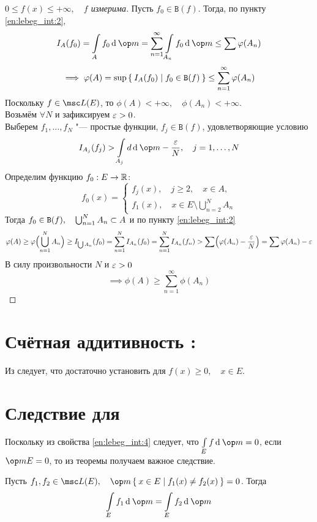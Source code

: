\begin{proof}[$ 0 \le f(x) \le +\infty, \quad f $ измерима]
	Пусть $ f_0 \in \mathtt B(f) $. Тогда, по пункту \ref{en:lebeg_int:2},
	$$ I_A(f_0) = \int\limits_A f_0 \di \op m = \sum_{n = 1}^\infty \int\limits_{A_n} f_0 \di \op m \le \sum \phi(A_n) $$
	$$ \implies \varphi(A) = \sup \Set{I_A(f_0) \mid f_0 \in \mathtt B(f)} \le \sum_{n = 1}^\infty \varphi(A_n) $$
	Поскольку $ f \in \msc L(E) $, то $ \phi(A) < +\infty, \quad \phi(A_n) < +\infty $. \\
	Возьмём $ \forall N $ и зафиксируем $ \varepsilon > 0 $. \\
	Выберем $ f_1, \dots, f_N $ "--- простые функции, $ f_j \in \mathtt B(f) $, удовлетворяющие условию
	$$ I_{A_j}(f_j) > \int\limits_{A_j} d \di \op m - \frac\eps N, \quad j = 1, \dots, N $$
	Определим функцию $ f_0 : E \to \mathbb{R} $:
	$$ f_0(x) =
	\begin{cases}
		f_j(x), \quad j \ge 2, \quad x \in A, \\
		f_1(x), \quad x \in E \setminus \bigcup_{n = 2}^N A_n
	\end{cases} $$
	Тогда $ f_0 \in \mathtt B(f), \quad \bigcup_{n = 1}^N A_n \subset A $ и по пункту \ref{en:lebeg_int:2}
	$$ \varphi(A) \ge \varphi \Bigl( \bigcup_{n = 1}^N A_n \Bigr) \ge I_{\bigcup A_n} (f_0) = \sum_{n = 1}^N I_{A_n} (f_0) = \sum_{n = 1}^N I_{A_n}(f_n) > \sum \Bigl( \varphi(A_n) - \frac{\varepsilon} N \Bigr) = \sum \varphi(A_n) - \varepsilon $$
	В силу произвольности $ N $ и $ \varepsilon > 0 $
	$$ \implies \phi(A) \ge \sum_{n = 1}^\infty \phi(A_n) $$
\end{proof}

\section{Счётная аддитивность : }

Из  следует, что достаточно установить  для $ f(x) \ge 0, \quad x \in E $.

\section{Следствие для }

Поскольку из свойства \ref{en:lebeg_int:4} следует, что $ \int\limits_E f \di \op m = 0 $, если $ \op m E = 0 $, то из теоремы получаем важное следствие.

\begin{implication}
	Пусть $ f_1, f_2 \in \msc L(E), \quad \op m \set{x \in E \mid f_1(x) \ne f_2(x)} = 0 $. Тогда
	$$ \int\limits_E f_1 \di \op m = \int\limits_E f_2 \di \op m $$
\end{implication}

